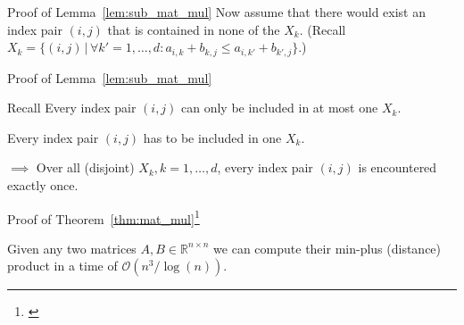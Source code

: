 \begin{frame}{Proof of Lemma~\ref{lem:sub_mat_mul}}
    Now assume that there would exist an index pair $(i, j)$ that is contained in none of the $X_k$.
    (Recall $X_k = \{ (i, j) \,|\, \forall k' = 1, \dots, d: a_{i, k} + b_{k, j} \leq a_{i, k'} + b_{k', j} \}$.)
    


    
\end{frame}

\begin{frame}{Proof of Lemma~\ref{lem:sub_mat_mul}}
    \begin{alertblock}{Recall}
        Every index pair $(i, j)$ can only be included in at most one $X_k$.

        Every index pair $(i, j)$ has to be included in one $X_k$.
    \end{alertblock}
    
    $\implies$ Over all (disjoint) $X_k, k = 1, \dots, d$, every index pair $(i, j)$ is encountered exactly once.

\end{frame}

\begin{frame}{Proof of Theorem~\ref{thm:mat_mul}\footnote[1]{\cite[Theorem~3.2]{Chan2007}}}
    \setcounter{theorem}{2}
    \begin{theorem}
        Given any two matrices $A, B \in \mathbb{R}^{n \times n}$ we can compute their min-plus (distance) product in a time of $\mathcal{O}\left( n^3 / \log(n) \right)$.
    \end{theorem}
\end{frame}

